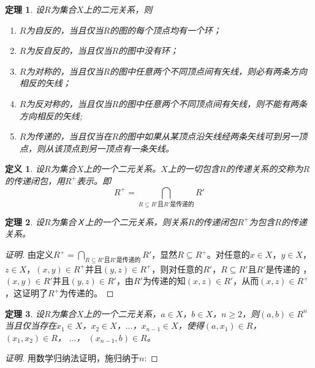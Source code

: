 \documentclass{book}[oneside]
\newtheorem{Def}{定义}[chapter]
\newtheorem{Thm}{定理}[chapter]
\begin{document}
\begin{CJK*}{UTF8}{gbsn}
{
}  

  \begin{Thm}
  设$R$为集合$X$上的二元关系，则
  \begin{enumerate}
  \item $R$为自反的，当且仅当$R$的图的每个顶点均有一个环；
  \item $R$为反自反的，当且仅当$R$的图中没有环；
  \item $R$为对称的，当且仅当$R$的图中任意两个不同顶点间有矢线，则必有两条方向相反的矢线；
  \item $R$为反对称的，当且仅当$R$的图中任意两个不同顶点间有矢线，则不能有两条方向相反的矢线;
  \item $R$为传递的，当且仅当在$R$的图中如果从某顶点沿矢线经两条矢线可到另一顶点，则从该顶点到另一顶点有一条矢线。
  \end{enumerate}
\end{Thm}

  \begin{Def}
    设$R$为集合$X$上的一个二元关系。$X$上的一切包含$R$的传递关系的交称为$R$的传递闭包，用$R^+$表示。即
    \begin{equation*}
      R^+ = \bigcap_{R \subseteq R' \text{且} R'\text{是传递的}}R'
    \end{equation*}
  \end{Def}
  \begin{Thm}
    设$R$为集合Ｘ上的一个二元关系，则关系$R$的传递闭包$R^+$为包含$R$的传递关系。
  \end{Thm}
\begin{proof}[证明]
    由定义$R^+ = \bigcap_{R \subseteq R' \text{且} R'\text{是传递的}}R'$，显然$R\subseteq R^+$。对任意的$x\in X$，$y\in X$，$z\in X$，$(x,y)\in R^+$并且$(y,z)\in R^+$，则对任意的$R'$，$R\subseteq R'$且$R'$是传递的
，$(x,y)\in R'$并且$(y,z)\in R'$，由$R'$为传递的知$(x,z)\in R'$，从而$(x,z)\in R^+$，这证明了$R^+$为传递的。
  \end{proof}



    \begin{Thm}
    设$R$为集合$X$上的一个二元关系，$a \in X$，$b \in X$，$n \geq 2$，则$(a,b) \in R^n$当且仅当存在$x_1\in X$，$x_2\in X$，$\ldots$，$x_{n-1}\in X$，使得$(a, x_1) \in R$，$(x_1, x_2)\in R$，  $\ldots$， $(x_{n-1}, b)\in R$。
  \end{Thm}
  \begin{proof}[证明]
  用数学归纳法证明，施归纳于$n$:


\end{proof}
\end{CJK*}
\end{document}
